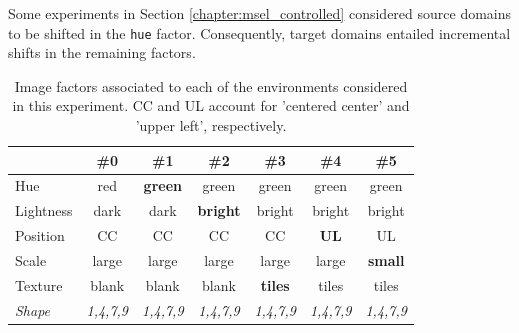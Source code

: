 \begin{dataset} Some experiments in Section \ref{chapter:msel_controlled}
    considered source domains to be shifted in the \texttt{hue} factor. Consequently, target
    domains entailed incremental shifts in the remaining factors.

    \begin{table}[H]
        \centering
        \begin{tabular}{l|c|c|c|c|c|c}
         &\#0 & \#1 & \#2 & \#3 & \#4 & \#5 \\
        \midrule
        Hue & red & \textbf{green} & green & green & green & green \\
        Lightness & dark & dark & \textbf{bright} & bright & bright & bright \\
        Position  & CC & CC & CC & CC & \textbf{UL} & UL \\
        Scale  & large & large & large & large & large & \textbf{small} \\
        Texture & blank & blank & blank & \textbf{tiles} & tiles & tiles \\
        \textit{Shape} & \textit{1,4,7,9} &  \textit{1,4,7,9} &  \textit{1,4,7,9} & \textit{1,4,7,9} & \textit{1,4,7,9} & \textit{1,4,7,9} \\
        \bottomrule
        \end{tabular}
        \caption{
        Image factors associated to each of the environments considered in this experiment. CC and UL account
        for 'centered center' and 'upper left', respectively.
        }
        \label{ds:hue_test}
    \end{table}
\end{dataset}

